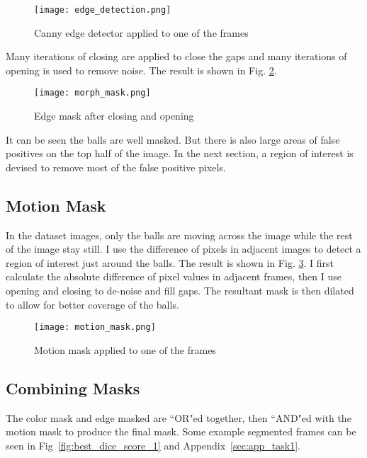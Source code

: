\documentclass{report}
\begin{document}
\begin{figure}[ht]
    \centering
    \texttt{[image: edge\_detection.png]}
    \caption{Canny edge detector applied to one of the frames}
    \label{fig:edge_mask}
\end{figure}

Many iterations of closing are applied to close the gaps and many iterations of opening is used to remove noise. The result is shown in Fig. \ref{fig:morph_mask}.

\begin{figure}[ht]
    \centering
    \texttt{[image: morph\_mask.png]}
    \caption{Edge mask after closing and opening}
    \label{fig:morph_mask}
\end{figure}

It can be seen the balls are well masked. But there is also large areas of false positives on the top half of the image. In the next section, a region of interest is devised to remove most of the false positive pixels.

\subsection{Motion Mask}

In the dataset images, only the balls are moving across the image while the rest of the image stay still. I use the difference of pixels in adjacent images to detect a region of interest just around the balls. The result is shown in Fig. \ref{fig:motion_mask}. I first calculate the absolute difference of pixel values in adjacent frames, then I use opening and closing to de-noise and fill gaps. The resultant mask is then dilated to allow for better coverage of the balls.

\begin{figure}[ht]
    \centering
    \texttt{[image: motion\_mask.png]}
    \caption{Motion mask applied to one of the frames}
    \label{fig:motion_mask}
\end{figure}

\subsection{Combining Masks}

The color mask and edge masked are ``OR"ed together, then ``AND"ed with the motion mask to produce the final mask. Some example segmented frames can be seen in Fig~\ref{fig:best_dice_score_1} and Appendix~\ref{sec:app_task1}.
\end{document}

